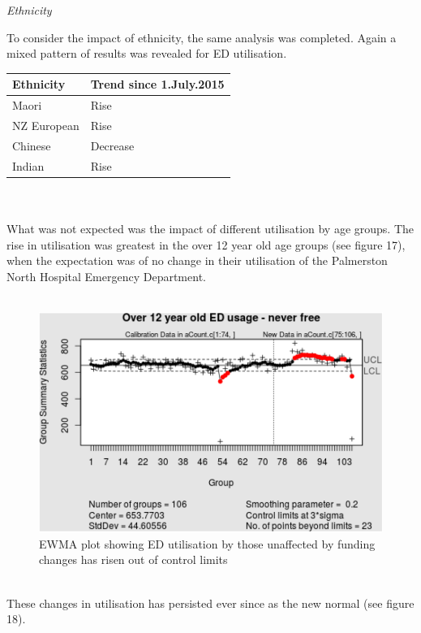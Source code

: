 \documentclass[11pt,a4paper]{article}
\begin{document}
\emph{Ethnicity}


To consider the impact of ethnicity, the same analysis was completed. Again a mixed pattern of results was revealed for ED utilisation.\\


\begin{tabular}{|l|l|}
\hline
        Ethnicity & Trend since 1.July.2015\\
\hline
        Maori & Rise\\
\hline
        NZ European & Rise\\
\hline
        Chinese & Decrease\\
\hline
        Indian & Rise\\
\hline
\end{tabular}
\\
\\
What was not expected was the impact of different utilisation by age groups. The rise in utilisation was greatest in the over 12 year old age groups (see figure 17), when the expectation was of no change in their utilisation of the Palmerston North Hospital Emergency Department.\\
\\
\begin{figure}[htp]
\centering
\includegraphics[scale=0.50]{Over12.png}
\caption{EWMA plot showing ED utilisation by those unaffected by funding changes has risen out of control limits}
\label{Rise in ED utilisation by over 12 years old}
\end{figure}
\\


These changes in utilisation has persisted ever since as the new normal (see figure 18).\\
\\
\end{document}
